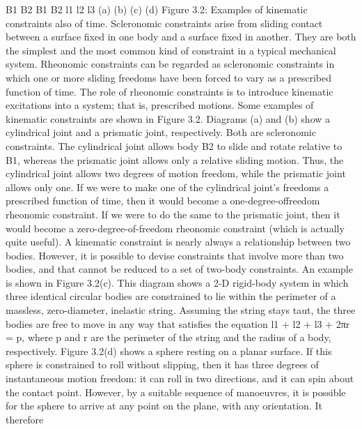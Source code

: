 B1 B2 B1 B2 l1 l2 l3 (a) (b) (c) (d) Figure 3.2: Examples of kinematic constraints also of time. Scleronomic constraints arise from sliding contact between a surface fixed in one body and a surface fixed in another. They are both the simplest and the most common kind of constraint in a typical mechanical system. Rheonomic constraints can be regarded as scleronomic constraints in which one or more sliding freedoms have been forced to vary as a prescribed function of time. The role of rheonomic constraints is to introduce kinematic excitations into a system; that is, prescribed motions. Some examples of kinematic constraints are shown in Figure 3.2. Diagrams (a) and (b) show a cylindrical joint and a prismatic joint, respectively. Both are scleronomic constraints. The cylindrical joint allows body B2 to slide and rotate relative to B1, whereas the prismatic joint allows only a relative sliding motion. Thus, the cylindrical joint allows two degrees of motion freedom, while the prismatic joint allows only one. If we were to make one of the cylindrical joint’s freedoms a prescribed function of time, then it would become a one-degree-offreedom rheonomic constraint. If we were to do the same to the prismatic joint, then it would become a zero-degree-of-freedom rheonomic constraint (which is actually quite useful). A kinematic constraint is nearly always a relationship between two bodies. However, it is possible to devise constraints that involve more than two bodies, and that cannot be reduced to a set of two-body constraints. An example is shown in Figure 3.2(c). This diagram shows a 2-D rigid-body system in which three identical circular bodies are constrained to lie within the perimeter of a massless, zero-diameter, inelastic string. Assuming the string stays taut, the three bodies are free to move in any way that satisfies the equation l1 + l2 + l3 + 2πr = p, where p and r are the perimeter of the string and the radius of a body, respectively. Figure 3.2(d) shows a sphere resting on a planar surface. If this sphere is constrained to roll without slipping, then it has three degrees of instantaneous motion freedom: it can roll in two directions, and it can spin about the contact point. However, by a suitable sequence of manoeuvres, it is possible for the sphere to arrive at any point on the plane, with any orientation. It therefore

